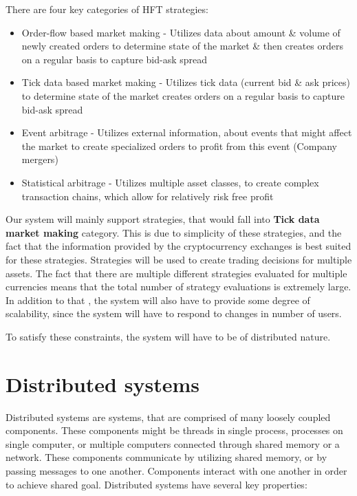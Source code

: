 There are four key categories of HFT strategies\cite{wiki:hft}:
\begin{itemize}
    \item {Order-flow based market making -
    Utilizes data about amount \& volume of newly created orders to determine state of the market \& then
    creates orders on a regular basis to capture bid-ask spread }
    \item {Tick data based market making - Utilizes tick data (current bid \& ask prices) to determine state of the market
    creates orders on a regular basis to capture bid-ask spread }
    \item {Event arbitrage - Utilizes external information, about events that might affect the market to
    create specialized orders to profit from this event (Company mergers)}
    \item {Statistical arbitrage - Utilizes multiple asset classes, to create complex transaction chains, which allow for relatively risk free profit }
\end{itemize}

Our system will mainly support strategies, that would fall into \textbf{Tick data market making} category. This is due
to simplicity of these strategies, and the fact that the information provided by the cryptocurrency exchanges is best suited
for these strategies.
Strategies will be used to create trading decisions for multiple assets. The fact that
there are multiple different strategies evaluated for multiple currencies means that the total number of strategy evaluations is
extremely large. In addition to that , the system will also have to provide some degree of scalability, since the system will
have to respond to changes in number of users.

To satisfy these constraints, the system will have to be of distributed nature.

\section{Distributed systems}
Distributed systems are systems, that are comprised of many loosely coupled components. These components might be threads
in single process, processes on single computer, or multiple computers connected through shared memory or a network.
These components communicate by utilizing shared memory, or by passing messages to one another. Components interact with
one another in order to achieve shared goal. Distributed systems have several key properties\cite{Coulouris:2011:DSC:2029110}:

